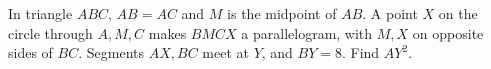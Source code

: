 In triangle $ABC$, $AB=AC$ and $M$ is the midpoint of $AB$. A point $X$ on the circle through $A,M,C$ makes $BMCX$ a parallelogram, with $M,X$ on opposite sides of $BC$. Segments $AX,BC$ meet at $Y$, and $BY=8$. Find $AY^2$.
